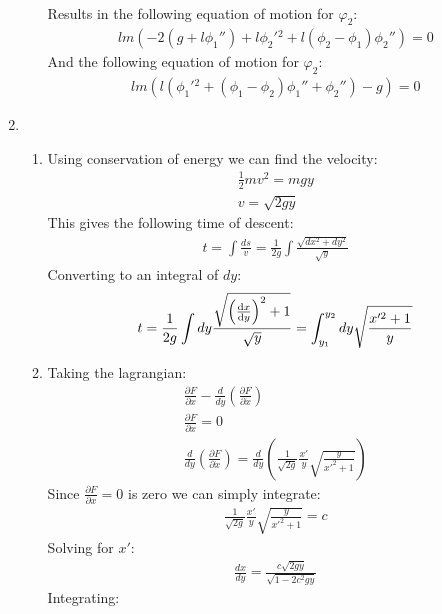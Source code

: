 \documentclass[12pt]{article}
\newcommand{\p}[2]{\frac{\partial #1}{\partial #2}}
\newcommand{\der}[2]{\frac{d #1}{d #2}}
\newcommand{\vp}{\varphi}
\begin{document}
\begin{enumerate}
\begin{enumerate}
\begin{gather*}
      \end{gather*}
      Results in the following equation of motion for $\vp_2$:
      \begin{gather*}
        l m \left(-2 \left(g+l \phi _1''\right)+l \phi _2'{}^2+l \left(\phi _2-\phi _1\right) \phi _2''\right)=0
      \end{gather*}
      And the following equation of motion for $\vp_2$:
      \begin{gather*}
        l m \left(l \left(\phi _1'{}^2+\left(\phi _1-\phi _2\right) \phi _1''+\phi _2''\right)-g\right)=0
      \end{gather*}
    \end{enumerate}
    \item
    \begin{enumerate}
      \item Using conservation of energy we can find the velocity:
      \begin{gather*}
        \frac{1}{2}mv^2=mgy\\
        v=\sqrt{2gy}
      \end{gather*}
      This gives the following time of descent:
      \begin{gather*}
        t=\int \frac{ds}{v}=\frac{1}{2g}\int \frac{\sqrt{dx^2+dy^2}}{\sqrt{y}}
      \end{gather*}
      Converting to an integral of $dy$:
      \begin{gather*}
        t=\frac{1}{2g}\int dy\frac{\sqrt{\left(\dv{x}{y}\right)^2+1}}{\sqrt{y}}=\int_{y_1}^{y_2}dy\sqrt{\frac{x'^2+1}{y}}
      \end{gather*}
      \item Taking the lagrangian:
      \begin{gather*}
        \p{F}{x}-\der{}{y}\left( \p{F}{\dot{x}} \right)\\
        \p{F}{x}=0\\
        \der{}{y}\left( \p{F}{\dot{x}} \right)=\der{}{y}\left(\frac{1}{\sqrt{2g}}\frac{x'}{y}\sqrt{\frac{y}{x'^2+1}}\right)
      \end{gather*}
      Since $\p{F}{x}=0$ is zero we can simply integrate:
      \begin{gather*}
        \frac{1}{\sqrt{2g}}\frac{x'}{y}\sqrt{\frac{y}{x'^2+1}}=c
      \end{gather*}
      Solving for $x'$:
      \begin{gather*}
        \der{x}{y}=\frac{c\sqrt{2gy}}{\sqrt{1-2c^2 gy}}
      \end{gather*}
      Integrating:

\end{enumerate}
\end{enumerate}
\end{document}
